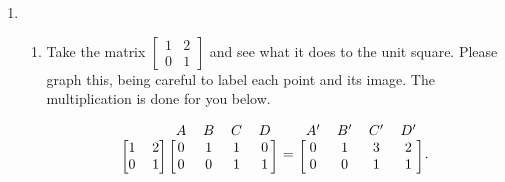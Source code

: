 \documentclass[../gatm.tex]{subfiles}
\begin{document}
\vspace*{-2\baselineskip}

\begin{enumerate}
\setcounter{enumi}{\value{mp_problem_i}}
\item \begin{enumerate}
\item Take the matrix $\left[\begin{smallmatrix}1 & 2 \\ 0 & 1\end{smallmatrix}\right]$ and see what it does to the unit square. Please graph this, being careful to label each point and its image. The multiplication is done for you below.

$$\begin{blockarray}{cccccc}
& & A & B & C & D \\
\begin{block}{[cc][cccc]}
1 & 2 & 0 & 1 & 1 & 0 \\
0 & 1 & 0 & 0 & 1 & 1 \\
\end{block}
\end{blockarray} =
\begin{blockarray}{cccc}
A' & B' & C' & D' \\
\begin{block}{[cccc]}
0 & 1 & 3 & 2 \\
0 & 0 & 1 & 1 \\
\end{block}
\end{blockarray}.$$


\end{enumerate}
\end{enumerate}
\end{document}
